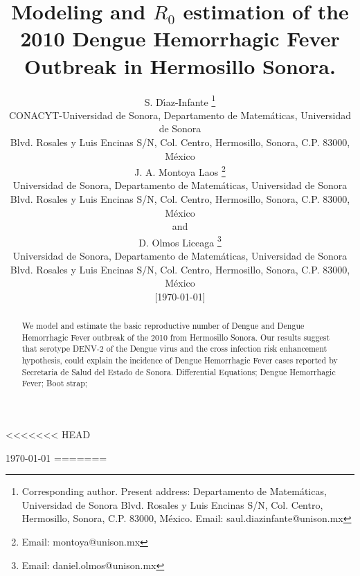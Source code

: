 \documentclass[draft, openbib]{imammb}
\numberwithin{equation}{section}
\begin{document}
<<<<<<< HEAD
    \begin{frontmatter}
        
    \end{frontmatter}
    \today
=======
    \title{
        Modeling and $R_0$ estimation  of the 2010 Dengue Hemorrhagic Fever 
        Outbreak in Hermosillo Sonora.
    }    
    \author{%
            {\sc S. D\'{\i}az-Infante%
                \footnote{Corresponding author. 
                    Present address: Departamento de Matem\'aticas, Universidad de Sonora
                    Blvd. Rosales y Luis Encinas S/N, Col. Centro, Hermosillo, Sonora, C.P. 83000,
                    M\'exico. Email: saul.diazinfante@unison.mx
                }
            }\\[2pt]
        CONACYT-Universidad de Sonora,
        Departamento de Matem\'aticas, Universidad de Sonora\\[6pt]
        Blvd. Rosales y Luis Encinas S/N, Col. Centro, Hermosillo, Sonora, C.P. 83000,
        M\'exico\\ 
        {\sc J. A. Montoya Laos 
            \footnote{Email: montoya@unison.mx}
        }\\[2pt]   
        Universidad de Sonora,
        Departamento de Matem\'aticas, Universidad de Sonora\\[6pt]
        Blvd. Rosales y Luis Encinas S/N, Col. Centro, Hermosillo, Sonora, C.P. 83000,
        M\'exico\\ 
        { \sc and
            \\
             D. Olmos Liceaga 
            \footnote{Email: daniel.olmos@unison.mx}
        }\\[2pt]   
        Universidad de Sonora,
        Departamento de Matem\'aticas, Universidad de Sonora\\[6pt]
        Blvd. Rosales y Luis Encinas S/N, Col. Centro, Hermosillo, Sonora, C.P. 83000,
        M\'exico\\ 
        {\rm [\today]}\vspace*{6pt}
    }
    
    \pagestyle{headings}
    \maketitle
    \begin{abstract}
        {We model and estimate the basic reproductive number of Dengue  and 
        Dengue Hemorrhagic Fever outbreak of the 2010 from Hermosillo Sonora.
        Our results suggest that serotype DENV-2 of the Dengue virus and the cross 
        infection risk enhancement hypothesis, could explain the incidence of
        Dengue Hemorrhagic Fever cases reported by Secretaria de Salud del Estado de 
        Sonora.}
        {Differential Equations;
        Dengue Hemorrhagic Fever; 
        Boot strap;}
    \end{abstract}
\end{document}
